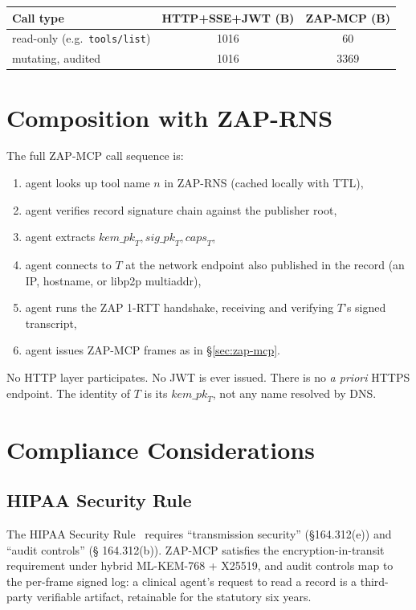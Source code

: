 \documentclass[11pt,a4paper]{article}
\theoremstyle{definition}
\theoremstyle{remark}
\newcommand{\zap}{\textsf{ZAP}\xspace}
\newcommand{\zapmcp}{\textsf{ZAP-MCP}\xspace}
\newcommand{\rns}{\textsf{ZAP-RNS}\xspace}
\begin{document}
\begin{table}[h]
\centering
\small
\begin{tabular}{lcc}
\toprule
\textbf{Call type} & \textbf{HTTP+SSE+JWT (B)} & \textbf{\zapmcp{} (B)} \\
\midrule
read-only (e.g.\ \texttt{tools/list})  & 1016 & 60 \\
mutating, audited                       & 1016 & 3369 \\
\bottomrule
\end{tabular}
\end{table}

\section{Composition with \rns{}}

The full \zapmcp{} call sequence is:

\begin{enumerate}[leftmargin=2em,itemsep=0.25em]
\item agent looks up tool name $n$ in \rns{} (cached locally with TTL),
\item agent verifies record signature chain against the publisher root,
\item agent extracts $\mathit{kem\_pk}_T, \mathit{sig\_pk}_T,
\mathit{caps}_T$,
\item agent connects to $T$ at the network endpoint also published in
the record (an IP, hostname, or libp2p multiaddr),
\item agent runs the \zap{} 1-RTT handshake, receiving and verifying
$T$'s signed transcript,
\item agent issues \zapmcp{} frames as in \S\ref{sec:zap-mcp}.
\end{enumerate}

No HTTP layer participates. No JWT is ever issued. There is no
\emph{a priori} HTTPS endpoint. The identity of $T$ is its
$\mathit{kem\_pk}_T$, not any name resolved by DNS.

\section{Compliance Considerations}\label{sec:compliance}

\subsection{HIPAA Security Rule}

The HIPAA Security Rule~\cite{hipaa_security} requires
``transmission security'' (\S 164.312(e)) and ``audit controls'' (\S
164.312(b)). \zapmcp{} satisfies the encryption-in-transit requirement
under hybrid ML-KEM-768 + X25519, and audit controls map to the per-frame
signed log: a clinical agent's request to read a record is a third-party
verifiable artifact, retainable for the statutory six years.
\end{document}
